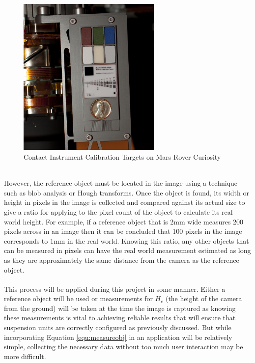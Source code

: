	\begin{figure}[h!]
		\centering
		\includegraphics[width=7cm]{../images/curiosity_calibration_chart.jpg}
		\caption{Contact Instrument Calibration Targets on Mars Rover Curiosity \citep{curiosity_image_calibration}}
		\label{fig:curiosity_calibration_chart}
	\end{figure}\\
	However, the reference object must be located in the image using a technique such as \gls{blob} analysis or Hough transforms. Once the object is found, its width or height in pixels in the image is collected and compared against its actual size to give a ratio for applying to the pixel count of the object to calculate its real world height. For example, if a reference object that is 2mm wide measures 200 pixels across in an image then it can be concluded that 100 pixels in the image corresponds to 1mm in the real world. Knowing this ratio, any other objects that can be measured in pixels can have the real world measurement estimated as long as they are approximately the same distance from the camera as the reference object.
	\\\\
	This process will be applied during this project in some manner. Either a reference object will be used or measurements for $H_c$ (the height of the camera from the ground) will be taken at the time the image is captured as knowing these measurements is vital to achieving reliable results that will ensure that suspension units are correctly configured as previously discussed. But while incorporating Equation \ref{equ:measureobj} in an application will be relatively simple, collecting the necessary data without too much user interaction may be more difficult.